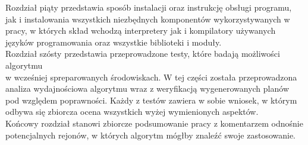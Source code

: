 	Rozdział piąty przedstawia sposób instalacji oraz instrukcję obsługi programu, jak i instalowania wszystkich
niezbędnych komponentów wykorzystywanych w pracy, w których skład wchodzą interpretery jak i kompilatory używanych języków programowania oraz 
wszystkie biblioteki i moduły.
\\

	Rozdział szósty przedstawia przeprowadzone testy, które badają możliwości algorytmu \\
	 w wcześniej spreparowanych środowiskach. W tej części została
	przeprowadzona analiza wydajnościowa algorytmu wraz z  weryfikacją wygenerowanych planów pod względem poprawności. 
	Każdy z testów zawiera w sobie wniosek, w którym odbywa się zbiorcza ocena wszystkich wyżej wymienionych aspektów.
\\

	Końcowy rozdział stanowi zbiorcze podsumowanie pracy z komentarzem odnośnie potencjalnych rejonów, w których algorytm mógłby znaleźć swoje
zastosowanie. 

